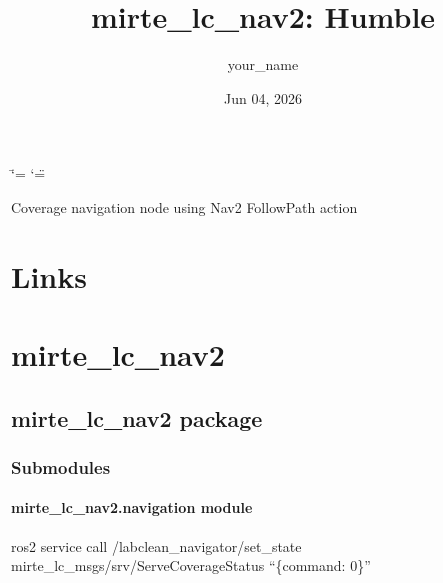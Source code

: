 \documentclass[letterpaper,10pt,english]{sphinxmanual}
\title{mirte\_lc\_nav2: Humble}
\date{Jun 04, 2026}
\author{your\_name}
\begin{document}
\ifdefined\shorthandoff
  \ifnum\catcode`\=\string=\active\shorthandoff{=}\fi
  \ifnum\catcode`\"=\active{}\fi
\fi

\pagestyle{empty}
\sphinxmaketitle
\pagestyle{plain}
\sphinxtableofcontents
\pagestyle{normal}
\label{\detokenize{index::doc}}


\sphinxAtStartPar
Coverage navigation node using Nav2 FollowPath action

\sphinxstepscope


\chapter{Links}
\label{\detokenize{__links:links}}\label{\detokenize{__links::doc}}
\sphinxstepscope


\chapter{mirte\_lc\_nav2}
\label{\detokenize{modules:mirte-lc-nav2}}\label{\detokenize{modules::doc}}
\sphinxstepscope


\section{mirte\_lc\_nav2 package}
\label{\detokenize{mirte_lc_nav2:mirte-lc-nav2-package}}\label{\detokenize{mirte_lc_nav2::doc}}

\subsection{Submodules}
\label{\detokenize{mirte_lc_nav2:submodules}}
\sphinxstepscope


\subsubsection{mirte\_lc\_nav2.navigation module}
\label{\detokenize{mirte_lc_nav2.navigation:module-mirte_lc_nav2.navigation}}\label{\detokenize{mirte_lc_nav2.navigation:mirte-lc-nav2-navigation-module}}\label{\detokenize{mirte_lc_nav2.navigation::doc}}
\sphinxAtStartPar
ros2 service call /labclean\_navigator/set\_state mirte\_lc\_msgs/srv/ServeCoverageStatus “\{command: 0\}”
\end{document}
